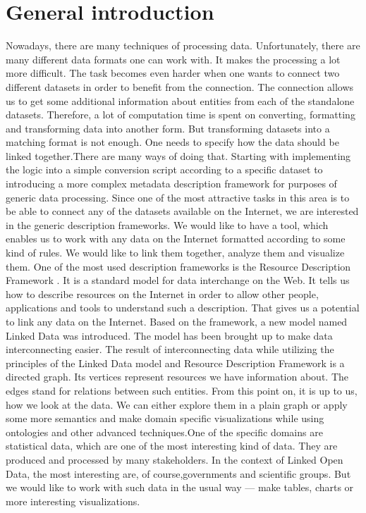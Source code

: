 \documentclass[a4paper,12pt,oneside]{report}
\begin{document}
 \chapter*{General introduction}
{Nowadays, there are many techniques of processing data. Unfortunately, there are many different data formats one can work with. It makes the processing a lot more difficult. The task becomes even harder when one wants to connect two different datasets in order to benefit from the connection. The connection allows us to get some additional information about entities from each of the standalone datasets. Therefore, a lot of computation time is spent on converting, formatting and transforming data into another form. But transforming datasets into
a matching format is not enough. One needs to specify how the data should be linked together.There are many ways of doing that. Starting with implementing the logic into a simple conversion script according to a specific dataset to introducing a more complex metadata description framework for purposes of generic data processing. Since one of the most attractive tasks in this area is to be able to connect any of the datasets available on the Internet, we are interested in the generic description frameworks. We would like to have a tool, which enables us to work with any data on the Internet formatted according to some kind of rules. We would like to link them together, analyze them and visualize them.
One of the most used description frameworks is the Resource Description Framework . It is a standard model for data interchange on the Web. It tells us how to describe resources on the Internet in order to allow other people, applications and tools to understand such a description. That gives us a potential to link any data on the Internet. Based on the framework, a new model named Linked Data was introduced. The model has been brought up to make data interconnecting easier.
The result of interconnecting data while utilizing the principles of the Linked Data model and Resource Description Framework is a directed graph. Its vertices represent resources we have information about. The edges stand for relations between such entities. From this point on, it is up to us, how we look at the data. We can either explore them in a plain graph or apply some more semantics and make domain specific visualizations while using ontologies and other advanced techniques.One of the specific domains are statistical data, which are one of the most interesting kind of data. They are produced and processed by many stakeholders. In the context of Linked Open Data, the most interesting are, of course,governments and scientific groups. But we would like to work with such data in the usual way — make tables, charts or more interesting visualizations. }
\end{document}
